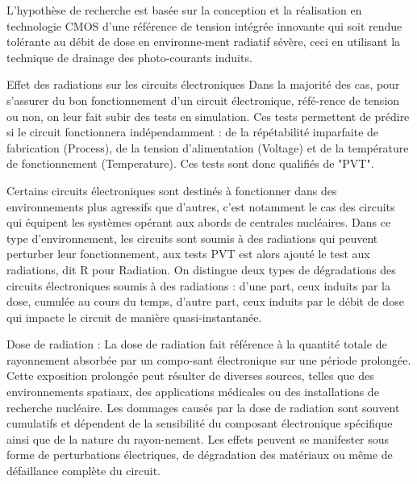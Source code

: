 
L'hypothèse de recherche est basée sur la conception et la réalisation en technologie CMOS d'une référence de tension intégrée innovante qui soit rendue tolérante au débit de dose en environne-ment radiatif sévère, ceci en utilisant la technique de drainage des photo-courants induits.

Effet des radiations sur les circuits électroniques
Dans la majorité des cas, pour s’assurer du bon fonctionnement d’un circuit électronique, réfé-rence de tension ou non, on leur fait subir des tests en simulation. Ces tests permettent de prédire si le circuit fonctionnera indépendamment : de la répétabilité imparfaite de fabrication (Process), de la tension d’alimentation (Voltage) et de la température de fonctionnement (Temperature). Ces tests sont donc qualifiés de "PVT".

Certains circuits électroniques sont destinés à fonctionner dans des environnements plus agressifs que d’autres, c’est notamment le cas des circuits qui équipent les systèmes opérant aux abords de centrales nucléaires. Dans ce type d'environnement, les circuits sont soumis à des radiations qui peuvent perturber leur fonctionnement, aux tests PVT est alors ajouté le test aux radiations, dit R pour Radiation.
On distingue deux types de dégradations des circuits électroniques soumis à des radiations : d’une part, ceux induits par la dose, cumulée au cours du temps, d’autre part, ceux induits par le débit de dose qui impacte le circuit de manière quasi-instantanée.

Dose de radiation :
La dose de radiation fait référence à la quantité totale de rayonnement absorbée par un compo-sant électronique sur une période prolongée. Cette exposition prolongée peut résulter de diverses sources, telles que des environnements spatiaux, des applications médicales ou des installations de recherche nucléaire. Les dommages causés par la dose de radiation sont souvent cumulatifs et dépendent de la sensibilité du composant électronique spécifique ainsi que de la nature du rayon-nement. Les effets peuvent se manifester sous forme de perturbations électriques, de dégradation des matériaux ou même de défaillance complète du circuit.

